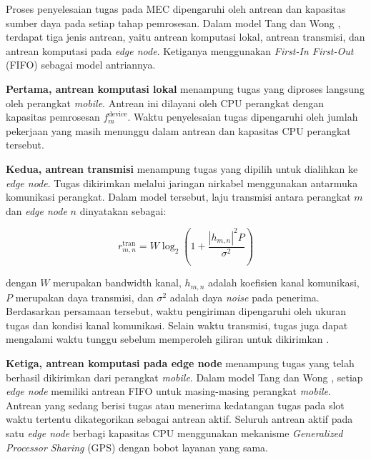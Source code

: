 Proses penyelesaian tugas pada MEC dipengaruhi oleh antrean dan kapasitas sumber daya pada setiap tahap pemrosesan. Dalam model Tang dan Wong \cite{tang2022deep}, terdapat tiga jenis antrean, yaitu antrean komputasi lokal, antrean transmisi, dan antrean komputasi pada \textit{edge node}. Ketiganya menggunakan \textit{First-In First-Out} (FIFO) sebagai model antriannya.

\textbf{Pertama, antrean komputasi lokal} menampung tugas yang diproses langsung oleh perangkat \textit{mobile}. Antrean ini dilayani oleh CPU perangkat dengan kapasitas pemrosesan $f_m^{\mathrm{device}}$. Waktu penyelesaian tugas dipengaruhi oleh jumlah pekerjaan yang masih menunggu dalam antrean dan kapasitas CPU perangkat tersebut.

\textbf{Kedua, antrean transmisi} menampung tugas yang dipilih untuk dialihkan ke \textit{edge node}. Tugas dikirimkan melalui jaringan nirkabel menggunakan antarmuka komunikasi perangkat. Dalam model tersebut, laju transmisi antara perangkat $m$ dan \textit{edge node} $n$ dinyatakan sebagai:

\begin{equation}
\label{eq:laju_transmisi}
r_{m,n}^{\mathrm{tran}}
=
W\log_2
\left(
1+\frac{|h_{m,n}|^2P}{\sigma^2}
\right)
\end{equation}


\noindent dengan $W$ merupakan bandwidth kanal, $h_{m,n}$ adalah koefisien kanal komunikasi, $P$ merupakan daya transmisi, dan $\sigma^2$ adalah daya \textit{noise} pada penerima. Berdasarkan persamaan tersebut, waktu pengiriman dipengaruhi oleh ukuran tugas dan kondisi kanal komunikasi. Selain waktu transmisi, tugas juga dapat mengalami waktu tunggu sebelum memperoleh giliran untuk dikirimkan \cite{tang2022deep}.

\textbf{Ketiga, antrean komputasi pada edge node} menampung tugas yang telah berhasil dikirimkan dari perangkat \textit{mobile}. Dalam model Tang dan Wong \cite{tang2022deep}, setiap \textit{edge node} memiliki antrean FIFO untuk masing-masing perangkat \textit{mobile}. Antrean yang sedang berisi tugas atau menerima kedatangan tugas pada slot waktu tertentu dikategorikan sebagai antrean aktif. Seluruh antrean aktif pada satu \textit{edge node} berbagi kapasitas CPU menggunakan mekanisme \textit{Generalized Processor Sharing} (GPS) dengan bobot layanan yang sama.

